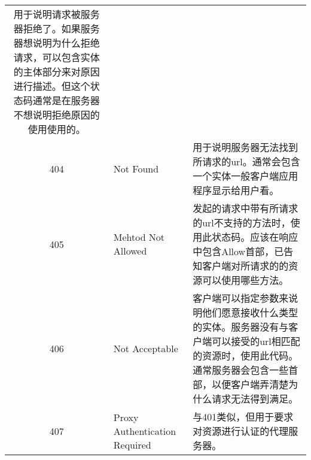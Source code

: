\begin{longtable}[]{@{}cll@{}}
\begin{minipage}[t]{0.30\columnwidth}
用于说明请求被服务器拒绝了。如果服务器想说明为什么拒绝请求，可以包含实体的主体部分来对原因进行描述。但这个状态码通常是在服务器不想说明拒绝原因的使用使用的。\strut
\end{minipage}\tabularnewline
\begin{minipage}[t]{0.32\columnwidth}\centering\strut
404\strut
\end{minipage} & \begin{minipage}[t]{0.30\columnwidth}\raggedright\strut
Not Found\strut
\end{minipage} & \begin{minipage}[t]{0.30\columnwidth}\raggedright\strut
用于说明服务器无法找到所请求的url。通常会包含一个实体一般客户端应用程序显示给用户看。\strut
\end{minipage}\tabularnewline
\begin{minipage}[t]{0.32\columnwidth}\centering\strut
405\strut
\end{minipage} & \begin{minipage}[t]{0.30\columnwidth}\raggedright\strut
Mehtod Not Allowed\strut
\end{minipage} & \begin{minipage}[t]{0.30\columnwidth}\raggedright\strut
发起的请求中带有所请求的url不支持的方法时，使用此状态码。应该在响应中包含Allow首部，已告知客户端对所请求的的资源可以使用哪些方法。\strut
\end{minipage}\tabularnewline
\begin{minipage}[t]{0.32\columnwidth}\centering\strut
406\strut
\end{minipage} & \begin{minipage}[t]{0.30\columnwidth}\raggedright\strut
Not Acceptable\strut
\end{minipage} & \begin{minipage}[t]{0.30\columnwidth}\raggedright\strut
客户端可以指定参数来说明他们愿意接收什么类型的实体。服务器没有与客户端可以接受的url相匹配的资源时，使用此代码。通常服务器会包含一些首部，以便客户端弄清楚为什么请求无法得到满足。\strut
\end{minipage}\tabularnewline
\begin{minipage}[t]{0.32\columnwidth}\centering\strut
407\strut
\end{minipage} & \begin{minipage}[t]{0.30\columnwidth}\raggedright\strut
Proxy Authentication Required\strut
\end{minipage} & \begin{minipage}[t]{0.30\columnwidth}\raggedright\strut
与401类似，但用于要求对资源进行认证的代理服务器。\strut

\end{minipage}
\end{longtable}
